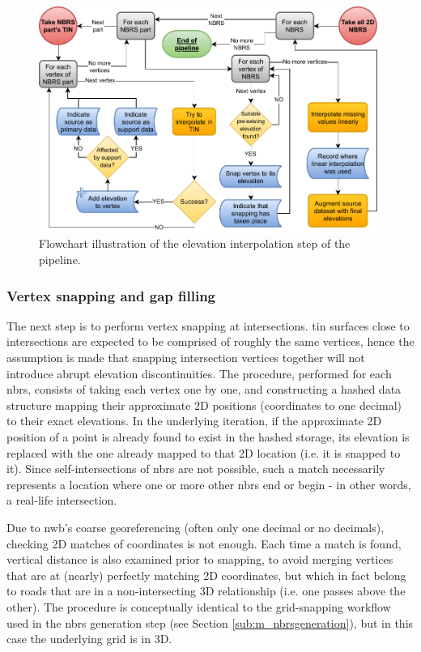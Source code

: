 \begin{figure}
    \centering
    \includegraphics[width=\linewidth]{final_report/figs/elevation_interpolation.pdf}
    \caption[Flowchart illustrating the elevation interpolation step]{Flowchart illustration of the elevation interpolation step of the pipeline.}
    \label{fig:elevationinterpolationflow}
\end{figure}

\subsubsection{Vertex snapping and gap filling}

The next step is to perform vertex snapping at intersections. \ac{tin} surfaces close to intersections are expected to be comprised of roughly the same vertices, hence the assumption is made that snapping intersection vertices together will not introduce abrupt elevation discontinuities. The procedure, performed for each \ac{nbrs}, consists of taking each vertex one by one, and constructing a hashed data structure mapping their approximate 2D positions (coordinates to one decimal) to their exact elevations. In the underlying iteration, if the approximate 2D position of a point is already found to exist in the hashed storage, its elevation is replaced with the one already mapped to that 2D location (i.e. it is snapped to it). Since self-intersections of \ac{nbrs} are not possible, such a match necessarily represents a location where one or more other \ac{nbrs} end or begin - in other words, a real-life intersection.

Due to \ac{nwb}'s coarse georeferencing (often only one decimal or no decimals), checking 2D matches of coordinates is not enough. Each time a match is found, vertical distance is also examined prior to snapping, to avoid merging vertices that are at (nearly) perfectly matching 2D coordinates, but which in fact belong to roads that are in a non-intersecting 3D relationship (i.e. one passes above the other). The procedure is conceptually identical to the grid-snapping workflow used in the \ac{nbrs} generation step (see Section \ref{sub:m_nbrsgeneration}), but in this case the underlying grid is in 3D.

